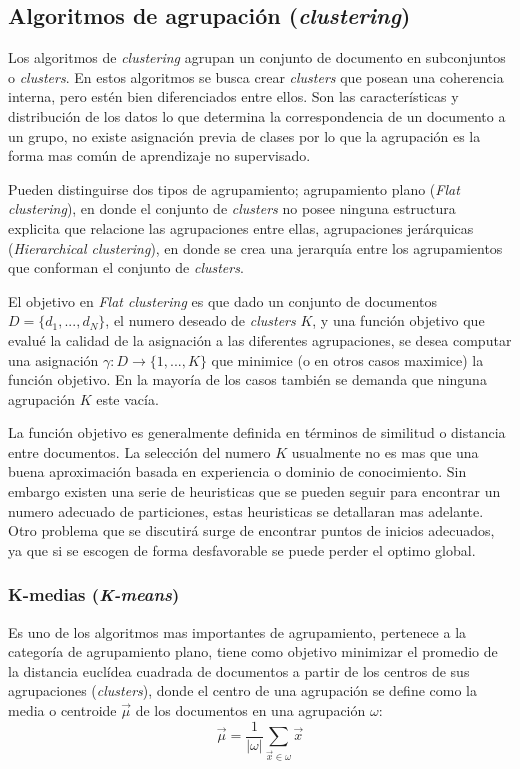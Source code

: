 \subsection{Algoritmos de agrupación (\textit{clustering})}
  Los algoritmos de \textit{clustering} agrupan un conjunto de documento en subconjuntos o \textit{clusters}. En estos algoritmos se busca crear \textit{clusters} que posean una coherencia interna, pero estén bien diferenciados entre ellos. Son las características y distribución de los datos lo que determina la correspondencia de un documento a un grupo, no existe asignación previa de clases por lo que la agrupación es la forma mas común de aprendizaje no supervisado.
  
  
  Pueden distinguirse dos tipos de agrupamiento; agrupamiento plano (\textit{Flat clustering}), en donde el conjunto de \textit{clusters} no posee ninguna estructura explicita que relacione las agrupaciones entre ellas, agrupaciones jerárquicas (\textit{Hierarchical clustering}), en donde se crea una jerarquía entre los agrupamientos que conforman el conjunto de  \textit{clusters}.\cite{informationretrieval}
  
  El objetivo en \textit{Flat clustering} es que dado un conjunto de documentos $D = \{d_1,...,d_N\}$, el numero deseado de \textit{clusters} $K$, y una función objetivo que evalué la calidad de la asignación a las diferentes agrupaciones, se desea computar una asignación $\gamma:D\to\{1,...,K\}$ que minimice (o en otros casos maximice) la función objetivo. En la mayoría de los casos también se demanda que ninguna agrupación $K$ este vacía.\cite{informationretrieval}

  La función objetivo es generalmente definida en términos de similitud o distancia entre documentos. La selección del numero $K$ usualmente no es mas que una buena aproximación basada en experiencia o dominio de conocimiento. Sin embargo existen una serie de heuristicas que se pueden seguir para encontrar un numero adecuado de particiones, estas heuristicas se detallaran mas adelante. Otro problema que se discutirá surge de encontrar puntos de inicios adecuados, ya que si se escogen de forma desfavorable se puede perder el optimo global.\cite{informationretrieval}

    
  \subsubsection{K-medias (\textit{K-means})}
    Es uno de los algoritmos mas importantes de agrupamiento, pertenece a la categoría de agrupamiento plano, tiene como objetivo minimizar el promedio de la distancia euclídea cuadrada de documentos a partir de los centros de sus agrupaciones (\textit{clusters}), donde el centro de una agrupación se define como la media o centroide $\vec{\mu}$ de los documentos en una agrupación $\omega$: 
    \begin{equation} \label{eq:centroide} 
\vec{\mu}= \frac{1}{|\omega|}\sum_{\vec{x}\in\omega}\vec{x}
\end{equation} 
 

